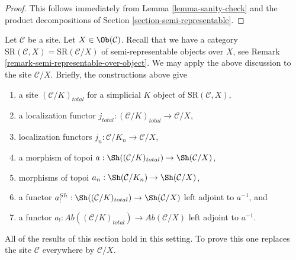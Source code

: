 \begin{proof}
This follows immediately from Lemma \ref{lemma-sanity-check}
and the product decompositions of Section \ref{section-semi-representable}.
\end{proof}

\begin{remark}
\label{remark-augmentation-over-object}
Let $\mathcal{C}$ be a site. Let $X \in \Ob(\mathcal{C})$.
Recall that we have a category
$\text{SR}(\mathcal{C}, X) = \text{SR}(\mathcal{C}/X)$
of semi-representable objects over $X$,
see Remark \ref{remark-semi-representable-over-object}.
We may apply the above discussion to the site
$\mathcal{C}/X$. Briefly, the constructions above give
\begin{enumerate}
\item a site $(\mathcal{C}/K)_{total}$ for a simplicial $K$ object
of $\text{SR}(\mathcal{C}, X)$,
\item a localization functor
$j_{total} : (\mathcal{C}/K)_{total} \to \mathcal{C}/X$,
\item localization functors $j_n : \mathcal{C}/K_n \to \mathcal{C}/X$,
\item a morphism of topoi
$a : \Sh((\mathcal{C}/K)_{total}) \to \Sh(\mathcal{C}/X)$,
\item morphisms of topoi
$a_n : \Sh(\mathcal{C}/K_n) \to \Sh(\mathcal{C}/X)$,
\item a functor
$a^{Sh}_! : \Sh((\mathcal{C}/K)_{total}) \to \Sh(\mathcal{C}/X)$
left adjoint to $a^{-1}$, and
\item a functor
$a_! : \textit{Ab}((\mathcal{C}/K)_{total}) \to \textit{Ab}(\mathcal{C}/X)$
left adjoint to $a^{-1}$.
\end{enumerate}
All of the results of this section hold in this setting.
To prove this one replaces
the site $\mathcal{C}$ everywhere by $\mathcal{C}/X$.
\end{remark}

